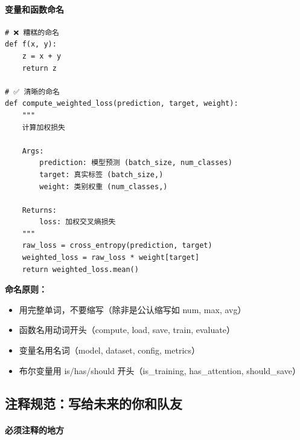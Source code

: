 \paragraph{变量和函数命名}

\begin{verbatim}
# ❌ 糟糕的命名
def f(x, y):
    z = x + y
    return z

# ✅ 清晰的命名
def compute_weighted_loss(prediction, target, weight):
    """
    计算加权损失

    Args:
        prediction: 模型预测 (batch_size, num_classes)
        target: 真实标签 (batch_size,)
        weight: 类别权重 (num_classes,)

    Returns:
        loss: 加权交叉熵损失
    """
    raw_loss = cross_entropy(prediction, target)
    weighted_loss = raw_loss * weight[target]
    return weighted_loss.mean()
\end{verbatim}

\textbf{命名原则：}
\begin{itemize}
  \item 用完整单词，不要缩写（除非是公认缩写如 num, max, avg）
  \item 函数名用动词开头（compute, load, save, train, evaluate）
  \item 变量名用名词（model, dataset, config, metrics）
  \item 布尔变量用 is/has/should 开头（is\_training, has\_attention, should\_save）
\end{itemize}

\subsection{注释规范：写给未来的你和队友}

\paragraph{必须注释的地方}

